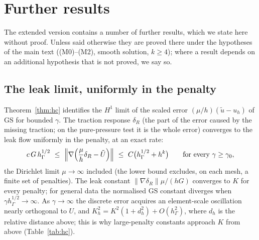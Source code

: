 \documentclass[pdflatex,sn-mathphys-num]{sn-jnl}
\theoremstyle{thmstyleone}
\theoremstyle{thmstylethree}
\newcommand{\hG}{h_\Gamma}
\newcommand{\ut}{\tilde u}
\newcommand{\norm}[1]{\lVert #1\rVert}
\newcommand{\GS}{\mathrm{GS}}
\begin{document}
\section{Further results}\label{sec:further}

The extended version \cite{PadhiExt} contains a number of further results, which we state here without proof. Unless said otherwise they are proved there under the hypotheses of the main text ((M0)--(M2), smooth solution, $k\ge4$); where a result depends on an additional hypothesis that is not proved, we say so.

\subsection{The leak limit, uniformly in the penalty}
Theorem~\ref{thm:hc} identifies the $H^1$ limit of the scaled error $(\mu/h)(\ut-u_h)$ of $\GS$ for bounded $\gamma$. The traction response $\delta_R$ (the part of the error caused by the missing traction; on the pure-pressure test it is the whole error) converges to the leak flow uniformly in the penalty, at an exact rate:
\[
c\,G\,\hG^{1/2}\ \le\ \Bigl\|\nabla\Bigl(\frac\mu h\delta_R-\tilde U\Bigr)\Bigr\|\ \le\ C\bigl(\hG^{1/2}+h^k\bigr)\qquad\text{for every }\gamma\ge\gamma_0,
\]
the Dirichlet limit $\mu\to\infty$ included (the lower bound excludes, on each mesh, a finite set of penalties). The leak constant $\norm{\nabla\delta_R}\mu/(hG)$ converges to $K$ for every penalty; for general data the normalised $\GS$ constant diverges when $\gamma\hG^{1/2}\to\infty$. As $\gamma\to\infty$ the discrete error acquires an element-scale oscillation nearly orthogonal to $U$, and $K_h^2=K^2(1+d_h^2)+O(\hG^2)$, where $d_h$ is the relative distance above; this is why large-penalty constants approach $K$ from above (Table~\ref{tab:hc}).
\end{document}
